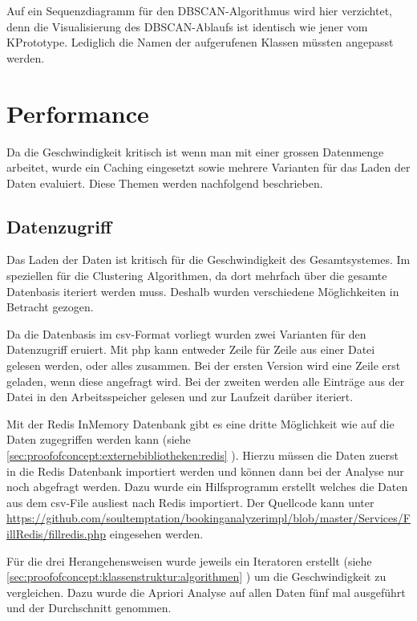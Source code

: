 Auf ein Sequenzdiagramm für den DBSCAN-Algorithmus wird hier verzichtet, denn die Visualisierung des DBSCAN-Ablaufs ist identisch wie jener vom KPrototype. Lediglich die Namen der aufgerufenen Klassen müssten angepasst werden.


\section{Performance}
Da die Geschwindigkeit kritisch ist wenn man mit einer grossen Datenmenge arbeitet, wurde ein Caching eingesetzt sowie mehrere Varianten für das Laden der Daten evaluiert. Diese Themen werden nachfolgend beschrieben.

\subsection{Datenzugriff}
\label{sec:proofofconcept:performance:datenzugriff}
Das Laden der Daten ist kritisch für die Geschwindigkeit des Gesamtsystemes. Im speziellen für die Clustering Algorithmen, da dort mehrfach über die gesamte Datenbasis iteriert werden muss. Deshalb wurden verschiedene Möglichkeiten in Betracht gezogen.

Da die Datenbasis im \gls{csv}-Format vorliegt wurden zwei Varianten für den Datenzugriff eruiert. Mit \gls{php} kann entweder Zeile für Zeile aus einer Datei gelesen werden, oder alles zusammen.  Bei der ersten Version wird eine Zeile erst geladen, wenn diese angefragt wird. Bei der zweiten werden alle Einträge aus der Datei in den Arbeitsspeicher gelesen und zur Laufzeit darüber iteriert.

Mit der Redis InMemory Datenbank gibt es eine dritte Möglichkeit wie auf die Daten zugegriffen werden kann (siehe \cref{sec:proofofconcept:externebibliotheken:redis} ). Hierzu müssen die Daten zuerst in die Redis Datenbank importiert werden und können dann bei der Analyse nur noch abgefragt werden. Dazu wurde ein Hilfsprogramm erstellt welches die Daten aus dem \gls{csv}-File ausliest nach Redis importiert. Der Quellcode kann unter \url{https://github.com/soultemptation/bookinganalyzerimpl/blob/master/Services/FillRedis/fillredis.php} eingesehen werden.

Für die drei Herangehensweisen wurde jeweils ein Iteratoren erstellt (siehe \cref{sec:proofofconcept:klassenstruktur:algorithmen} ) um die Geschwindigkeit zu vergleichen. Dazu wurde die Apriori Analyse auf allen Daten fünf mal ausgeführt und der Durchschnitt genommen.

